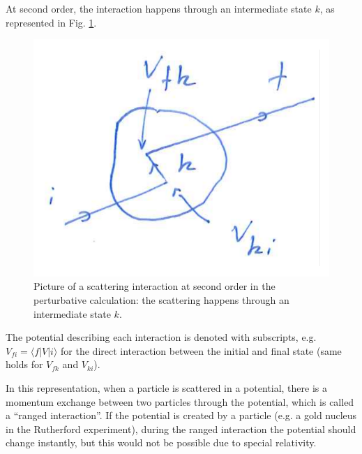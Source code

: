 At second order, the interaction happens through an intermediate state $k$, as represented in Fig. \ref{quantum-scattering:fig3}.
\begin{figure}[h]
    \centering
    \includegraphics[scale=0.3]{Figures/secondorder.pdf}
    \caption{Picture of a scattering interaction at second order in the perturbative calculation: the scattering happens through an intermediate state $k$.}
    \label{quantum-scattering:fig3}
\end{figure}
The potential describing each interaction is denoted with subscripts, e.g. $V_{fi} = \langle f | V | i \rangle$ for the direct interaction between the initial and final state (same holds for $V_{fk}$ and $V_{ki}$).

In this representation, when a particle is scattered in a potential, there is a  momentum exchange between two particles through the potential, which is called a ``ranged interaction''. If the potential is created by a particle (e.g. a gold nucleus in the Rutherford experiment), during the ranged interaction the potential should  change instantly, but this would not be possible due to special relativity.

